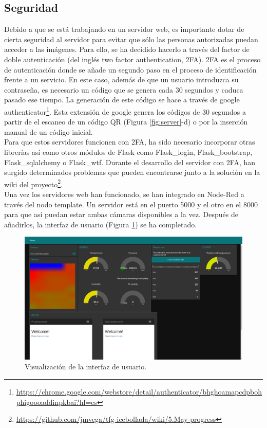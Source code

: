 \subsection{Seguridad}
Debido a que se está trabajando en un servidor web, es importante dotar de cierta seguridad al servidor para evitar que sólo las personas autorizadas puedan acceder a las imágenes. Para ello, se ha decidido hacerlo a través del factor de doble autenticación (del inglés two factor authentication, 2FA). 2FA es el proceso de autenticación donde se añade un segundo paso en el proceso de identificación frente a un servicio. En este caso, además de que un usuario introduzca su contraseña, es necesario un código que se genera cada 30 segundos y caduca pasado ese tiempo. La generación de este código se hace a través de google authenticator\footnote{\url{https://chrome.google.com/webstore/detail/authenticator/bhghoamapcdpbohphigoooaddinpkbai?hl=es}}. Esta extensión de google genera los códigos de 30 segundos a partir de el escaneo de un código QR (Figura \ref{fig:server}-d) o por la inserción manual de un código inicial.\\

Para que estos servidores funcionen con 2FA, ha sido necesario incorporar otras librerías así como otros módulos de Flask como Flask\_login, Flask\_bootstrap, Flask\_sqlalchemy o Flask\_wtf. Durante el desarrollo del servidor con 2FA, han surgido determinados problemas que pueden encontrarse junto a la solución en la wiki del proyecto\footnote{\url{https://github.com/jmvega/tfg-icebollada/wiki/5.May-progress}}.\\

Una vez los servidores web han funcionado, se han integrado en Node-Red a través del nodo template. Un servidor está en el puerto 5000 y el otro en el 8000 para que así puedan estar ambas cámaras disponibles a la vez. Después de añadirlos, la interfaz de usuario (Figura \ref{fig:UIcompleta}) se ha completado.\\
\begin{figure} [h!]
  \begin{center}
    \includegraphics[width=16cm]{figs/UIcompleta}
  \end{center}
  \caption{Visualización de la interfaz de usuario.}
  \label{fig:UIcompleta}
\end{figure}

